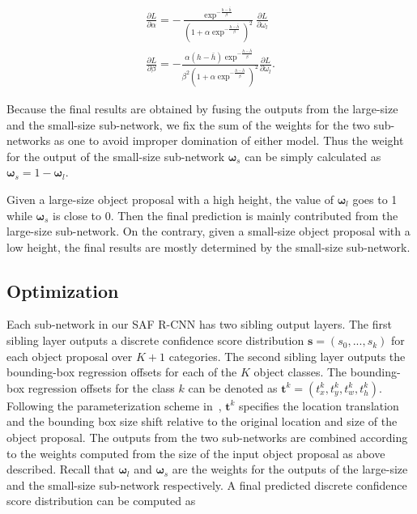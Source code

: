 \documentclass[journal]{IEEEtran}
\begin{document}
\begin{equation}
	\begin{aligned}
		\frac{\partial L}{\partial \alpha} = - \frac{\exp^{-\frac{h - \bar{h}}{\beta}}}{(1 + \alpha \exp^{-\frac{h - \bar{h}}{\beta}})^{2}} \frac{\partial L}{\partial {\omega}_l} \\
		\frac{\partial L}{\partial \beta} = - \frac{\alpha (h - \bar{h}) \exp^{-\frac{h - \bar{h}}{\beta}}}{\beta^{2} (1 + \alpha \exp^{-\frac{h - \bar{h}}{\beta}})^{2}} \frac{\partial L}{\partial {\omega}_l}.
		\label{eq:derivative_alpha}
	\end{aligned}
\end{equation}



Because the final results are obtained by fusing the outputs from the large-size and the small-size sub-network, we fix the sum of the weights for the two sub-networks as one to avoid improper domination of either model. Thus the weight for the output of the small-size sub-network $\boldsymbol{\omega}_s$ can be simply calculated as $\boldsymbol{\omega}_s = 1 - \boldsymbol{\omega}_l$.

Given a large-size object proposal with a high height, the value of $\boldsymbol{\omega}_l$ goes to 1 while $\boldsymbol{\omega}_s$ is close to 0. Then the final prediction is mainly contributed from the large-size sub-network. On the contrary, given a small-size object proposal with a low height, the final results are mostly determined by the small-size sub-network.


\subsection{Optimization}
Each sub-network in our SAF R-CNN has two sibling output layers. The first sibling layer outputs a discrete confidence score distribution $\boldsymbol{s} = (s_0,...,s_k)$ for each object proposal over $K+1$ categories. The second sibling layer outputs the bounding-box regression offsets for each of the $K$ object classes. The bounding-box regression offsets for the class $k$ can be denoted as $\boldsymbol{t}^k = (t_x^k, t_y^k, t_w^k, t_h^k)$. Following the parameterization scheme in~\cite{girshick2014rich}, $\boldsymbol{t}^k$ specifies the location translation and the bounding box size shift relative to the original location and size of the object proposal. The outputs from the two sub-networks are combined according to the weights computed from the size of the input object proposal as above described. Recall that $\boldsymbol{\omega}_l$ and $\boldsymbol{\omega}_s$ are the weights for the outputs of the large-size and the small-size sub-network respectively. A final predicted discrete confidence score distribution can be computed as
\end{document}
